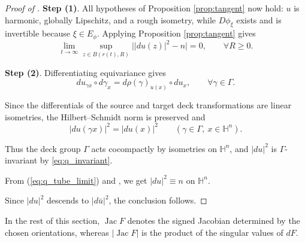 \documentclass[11pt]{amsart}
\theoremstyle{plain}
\theoremstyle{plain}
\theoremstyle{plain}
\newcommand{\Hn}{\mathbb H^n}
\newcommand{\Jac}{\operatorname{Jac}}
\numberwithin{equation}{section}
\begin{document}
\begin{proof}[Proof of ]
\textbf{Step (1)}. All hypotheses of Proposition \ref{prop:tangent} now hold:
\(u\) is harmonic, globally Lipschitz, and a rough isometry, while
\(D\phi_\xi\) exists and is invertible because \(\xi\in E_\phi\).  Applying Proposition \ref{prop:tangent} gives
\begin{equation}\label{eq:q_tube_limit}
\lim_{t\to\infty}
\sup_{z\in B(r(t),R)}\bigl||du(z)|^2-n\bigr|=0, \quad \quad \forall R\geq 0.
\end{equation}

\textbf{Step (2)}. Differentiating equivariance gives
\[
du_{\gamma x}\circ d\gamma_x
=
d\rho(\gamma)_{u(x)}\circ du_x, \quad \quad \forall \gamma\in \Gamma.
\]

Since the differentials of the source and target deck transformations are linear isometries, the Hilbert--Schmidt norm is preserved and
\begin{equation}\label{eq:q_invariant}
|du(\gamma x)|^2= |du(x)|^2 \qquad (\gamma\in\Gamma,\ x\in\Hn).
\end{equation}

Thus the deck group \(\Gamma\) acts cocompactly by isometries on \(\Hn\), and \(|du|^2\) is \(\Gamma\)-invariant by \eqref{eq:q_invariant}.  

From (\ref{eq:q_tube_limit}) and , we get $|du|^2\equiv n$ on $\Hn$.

Since \(|du|^2\) descends to \(|d\bar u|^2\), the conclusion follows.
\end{proof}


In the rest of this section, \(\Jac F\) denotes the signed Jacobian determined by the chosen
orientations, whereas \( |\Jac F| \) is the product of the singular
values of \(dF\).
\end{document}
